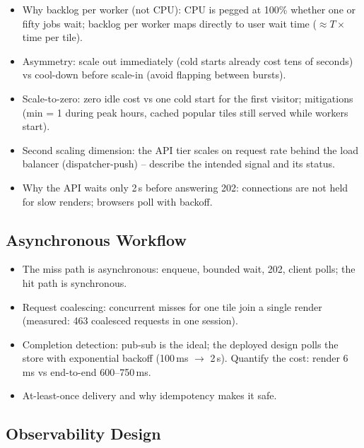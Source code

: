 \documentclass[a4paper,12pt]{article}
\begin{document}
\begin{yourwriting}
\begin{itemize}
    \item Why backlog per worker (not CPU): CPU is pegged at 100\% whether one or fifty jobs wait; backlog per worker maps directly to user wait time ($\approx T \times$ time per tile).
    \item Asymmetry: scale out immediately (cold starts already cost tens of seconds) vs cool-down before scale-in (avoid flapping between bursts).
    \item Scale-to-zero: zero idle cost vs one cold start for the first visitor; mitigations (min = 1 during peak hours, cached popular tiles still served while workers start).
    \item Second scaling dimension: the API tier scales on request rate behind the load balancer (dispatcher-push) -- describe the intended signal and its status.
    \item Why the API waits only 2\,s before answering 202: connections are not held for slow renders; browsers poll with backoff.
\end{itemize}
\end{yourwriting}

\subsection{Asynchronous Workflow}

\begin{yourwriting}
\begin{itemize}
    \item The miss path is asynchronous: enqueue, bounded wait, 202, client polls; the hit path is synchronous.
    \item Request coalescing: concurrent misses for one tile join a single render (measured: 463 coalesced requests in one session).
    \item Completion detection: pub-sub is the ideal; the deployed design polls the store with exponential backoff (100\,ms $\rightarrow$ 2\,s). Quantify the cost: render 6\,ms vs end-to-end 600--750\,ms.
    \item At-least-once delivery and why idempotency makes it safe.
\end{itemize}
\end{yourwriting}

\subsection{Observability Design}
\end{document}
